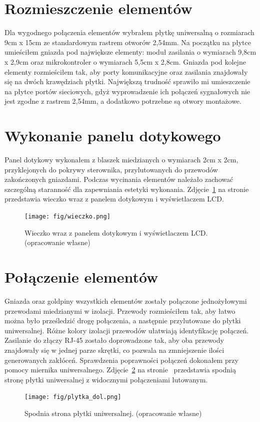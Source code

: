 \documentclass[11pt]{report}
\begin{document}
 \section{Rozmieszczenie elementów}
 Dla wygodnego połączenia elementów wybrałem płytkę uniwersalną o rozmiarach 9cm x 15cm ze standardowym rastrem otworów 2,54mm.
 Na początku na płytce umieściłem gniazda pod największe elementy: moduł zasilania o wymiarach 9,8cm x 2,9cm oraz mikrokontroler o wymiarach 5,5cm x 2,8cm. Gniazda pod kolejne elementy rozmieściłem tak, aby porty komunikacyjne oraz zasilania znajdowały się na dwóch krawędziach płytki. 
 Największą trudność sprawiło mi umieszczenie na płytce portów sieciowych, gdyż wyprowadzenie ich połączeń sygnałowych nie jest zgodne z rastrem 2,54mm, a dodatkowo potrzebne są otwory montażowe.
  
  \section{Wykonanie panelu dotykowego}
 Panel dotykowy wykonałem z blaszek miedzianych o wymiarach 2cm x 2cm, przyklejonych do pokrywy sterownika, przylutowanych do przewodów zakończonych gniazdami. Podczas wycinania elementów należało zachować szczególną staranność dla zapewniania estetyki wykonania.
  Zdjęcie~\ref{fig:wieczko} na stronie~\pageref{fig:wieczko} przedstawia wieczko wraz z panelem dotykowym i wyświetlaczem LCD.
\begin{figure}[ht]
\centering
\texttt{[image: fig/wieczko.png]}
\caption{Wieczko wraz z panelem dotykowym i wyświetlaczem LCD. (opracowanie własne)}
\label{fig:wieczko}
\end{figure}

 \section{Połączenie elementów}
 Gniazda oraz goldpiny wszystkich elementów zostały połączone jednożyłowymi przewodami miedzianymi w izolacji. Przewody rozmieściłem tak, aby łatwo można było prześledzić drogę połączenia, a następnie przylutowane do płytki uniwersalnej. Różne kolory izolacji przewodów ułatwiają identyfikację połączeń. Zasilanie do złączy RJ-45 zostało doprowadzone tak, aby oba przewody znajdowały się w jednej parze skrętki, co pozwala na zmniejszenie ilości generowanych zakłóceń.
 Sprawdzenia poprawności połączeń dokonałem przy pomocy miernika uniwersalnego.
   Zdjęcie~\ref{fig:uni_dol} na stronie~\pageref{fig:uni_dol} przedstawia spodnią stronę płytki uniwersalnej z widocznymi połączeniami lutowanym.
\begin{figure}[ht]
\centering
\texttt{[image: fig/plytka\_dol.png]}
\caption{Spodnia strona płytki uniwersalnej. (opracowanie własne)}
\label{fig:uni_dol}
\end{figure}
\end{document}
